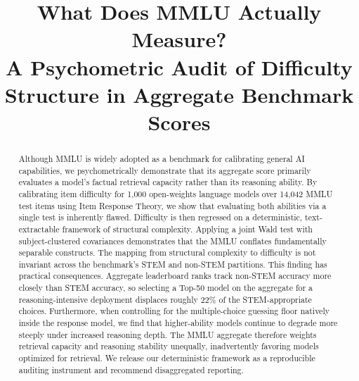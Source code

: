 \documentclass[11pt,a4paper]{article}
\title{What Does MMLU Actually Measure? \\ A Psychometric Audit of Difficulty Structure in Aggregate Benchmark Scores}
\author{}
\date{}
\begin{document}
\maketitle

\begin{abstract}
Although MMLU is widely adopted as a benchmark for calibrating general AI capabilities, we psychometrically demonstrate that its aggregate score primarily evaluates a model's factual retrieval capacity rather than its reasoning ability. By calibrating item difficulty for 1,000 open-weights language models over 14,042 MMLU test items using Item Response Theory, we show that evaluating both abilities via a single test is inherently flawed. Difficulty is then regressed on a deterministic, text-extractable framework of structural complexity. Applying a joint Wald test with subject-clustered covariances demonstrates that the MMLU conflates fundamentally separable constructs. The mapping from structural complexity to difficulty is not invariant across the benchmark's STEM and non-STEM partitions. This finding has practical consequences. Aggregate leaderboard ranks track non-STEM accuracy more closely than STEM accuracy, so selecting a Top-50 model on the aggregate for a reasoning-intensive deployment displaces roughly 22\% of the STEM-appropriate choices. Furthermore, when controlling for the multiple-choice guessing floor natively inside the response model, we find that higher-ability models continue to degrade more steeply under increased reasoning depth. The MMLU aggregate therefore weights retrieval capacity and reasoning stability unequally, inadvertently favoring models optimized for retrieval. We release our deterministic framework as a reproducible auditing instrument and recommend disaggregated reporting.
\end{abstract}







\end{document}
